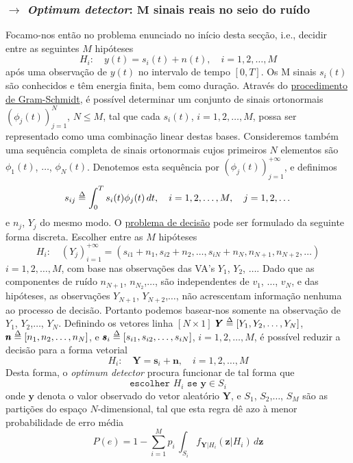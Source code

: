\subsubsection[4.2.2 \textit{Optimum detector}: \textit{M} sinais reais]{$\rightarrow$ \textit{Optimum detector}: $\pmb{M}$ sinais reais no seio do ruído}
Focamo-nos então no problema enunciado no início desta secção, i.e., decidir entre as seguintes $M$ hipóteses
$$
    H_i:\quad y(t) = s_i(t) + n(t),\quad i = 1,2,\dots,M 
$$
após uma observação de $y(t)$ no intervalo de tempo $[0, T]$. Os M sinais $s_i(t)$ são conhecidos e têm energia finita, bem como duração. Através do \hyperref[def:gram-schmidt]{procedimento de Gram-Schmidt}, é possível determinar um conjunto de sinais ortonormais $(\phi_j(t))_{j=1}^{N}$, $N \leq M$, tal que cada $s_i(t)$, $i=1,2,\dots,M$, possa ser representado como uma combinação linear destas bases. Consideremos também uma sequência completa de sinais ortonormais cujos primeiros $N$ elementos são $\phi_1(t)$, $\dots$, $\phi_N(t)$. Denotemos esta sequência por $(\phi_j(t))_{j=1}^{+\infty}$, e definimos
$$
    s_{ij} \delequal \int_{0}^{T} s_i(t)\phi_j(t)\, dt,\quad i=1,2,\dots,M,\quad j=1,2,\dots 
$$
e $n_j$, $Y_j$ do mesmo modo. O \underline{problema de decisão} pode ser formulado da seguinte forma discreta. Escolher entre as $M$ hipóteses
$$
    H_i:\quad (Y_j)_{i=1}^{+\infty} = (s_{i1}+n_1, s_{i2}+n_2, \dots, s_{iN}+n_N, n_{N+1}, n_{N+2},\dots)
$$
$i=1,2,\dots,M$, com base nas observações das VA's $Y_1$, $Y_2$, $\dots$. Dado que as componentes de ruído $n_{N+1}$, $n_{N_2}$,$\dots$, são independentes de $v_1$, $\dots$, $v_N$, e das hipóteses, as observações $Y_{N+1}$, $Y_{N+2}$,$\dots$, não acrescentam informação nenhuma ao processo de decisão. Portanto podemos basear-nos somente na observação de $Y_1$, $Y_2$,$\dots$, $Y_N$. Definindo os vetores linha $[N \times 1]$ $\pmb{Y} \delequal [Y_1,Y_2,\dots,Y_N]$, $\pmb{n} \delequal [n_1,n_2,\dots,n_N]$, e $\pmb{s}_i \delequal [s_{i1},s_{i2},\dots,s_{iN}]$, $i=1,2,\dots,M$, é possível reduzir a decisão para a forma vetorial 
$$
    H_i:\quad \pmb{Y} = \pmb{s}_i + \pmb{n},\quad i=1,2,\dots,M
$$
Desta forma, o \textit{optimum detector} procura funcionar de tal forma que
$$
    \texttt{escolher } H_i \texttt{ se } \pmb{y} \in S_i
$$
onde $\pmb{y}$ denota o valor observado do vetor aleatório $\pmb{Y}$, e $S_1$, $S_2$,$\dots$, $S_M$ são as partições do espaço $N$-dimensional, tal que esta regra dê azo à menor probabilidade de erro média
$$
    P(e) = 1 - \sum_{i=1}^{M} p_i\, \int_{S_i} f_{\pmb{Y}|H_i}\left( \pmb{z} | H_i \right)\, d\pmb{z}
$$
